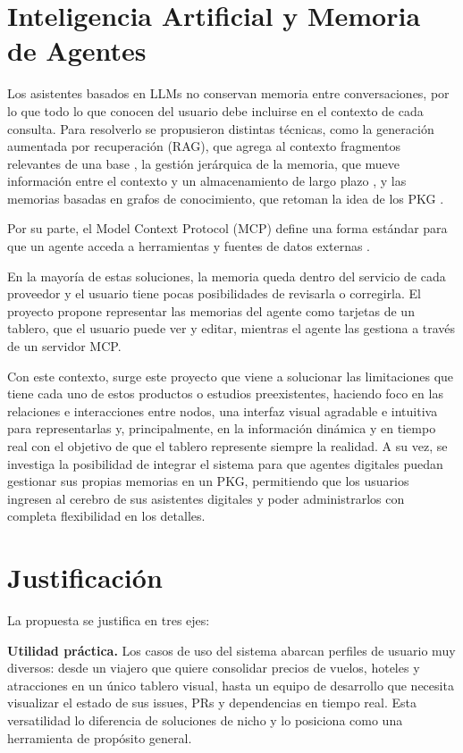 \section{Inteligencia Artificial y Memoria de Agentes}
Los asistentes basados en LLMs no conservan memoria entre conversaciones, por lo que todo lo que conocen del usuario debe incluirse en el contexto de cada consulta. Para resolverlo se propusieron distintas técnicas, como la generación aumentada por recuperación (RAG), que agrega al contexto fragmentos relevantes de una base \cite{lewis2020}, la gestión jerárquica de la memoria, que mueve información entre el contexto y un almacenamiento de largo plazo \cite{packer2023}, y las memorias basadas en grafos de conocimiento, que retoman la idea de los PKG \cite{rasmussen2025}.

Por su parte, el Model Context Protocol (MCP) define una forma estándar para que un agente acceda a herramientas y fuentes de datos externas \cite{mcp_intro}.

En la mayoría de estas soluciones, la memoria queda dentro del servicio de cada proveedor y el usuario tiene pocas posibilidades de revisarla o corregirla. El proyecto propone representar las memorias del agente como tarjetas de un tablero, que el usuario puede ver y editar, mientras el agente las gestiona a través de un servidor MCP.

Con este contexto, surge este proyecto que viene a solucionar las limitaciones que tiene cada uno de estos productos o estudios preexistentes, haciendo foco en las relaciones e interacciones entre nodos, una interfaz visual agradable e intuitiva para representarlas y, principalmente, en la información dinámica y en tiempo real con el objetivo de que el tablero represente siempre la realidad. A su vez, se investiga la posibilidad de integrar el sistema para que agentes digitales puedan gestionar sus propias memorias en un PKG, permitiendo que los usuarios ingresen al cerebro de sus asistentes digitales y poder administrarlos con completa flexibilidad en los detalles.

\section{Justificación}
La propuesta se justifica en tres ejes:

\textbf{Utilidad práctica.} Los casos de uso del sistema abarcan perfiles de usuario muy diversos: desde un viajero que quiere consolidar precios de vuelos, hoteles y atracciones en un único tablero visual, hasta un equipo de desarrollo que necesita visualizar el estado de sus issues, PRs y dependencias en tiempo real. Esta versatilidad lo diferencia de soluciones de nicho y lo posiciona como una herramienta de propósito general.

